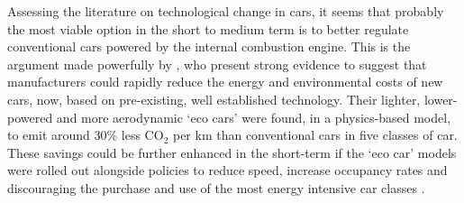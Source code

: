 \documentclass[a4paper, 11pt, twoside]{Thesis}
\begin{document}
Assessing the literature on technological change in cars, it seems that
probably the most viable option in the short to medium term is to better
regulate conventional cars powered by the internal combustion engine.
This is the argument made powerfully by \citet{plowden2008cars}, who present
strong evidence to suggest that manufacturers could rapidly reduce the
energy and environmental costs of new cars, now, based on pre-existing,
well established technology. Their lighter, lower-powered and more
aerodynamic `eco cars' were found, in a physics-based model, to emit
around 30\% less CO$_2$ per km than conventional cars in five classes of
car. These savings could be further enhanced in the short-term if the `eco car'
models were rolled out alongside policies to reduce speed, increase occupancy
rates and discouraging the purchase and use of the most energy intensive
car classes \citep{plowden2008cars}.
\end{document}
